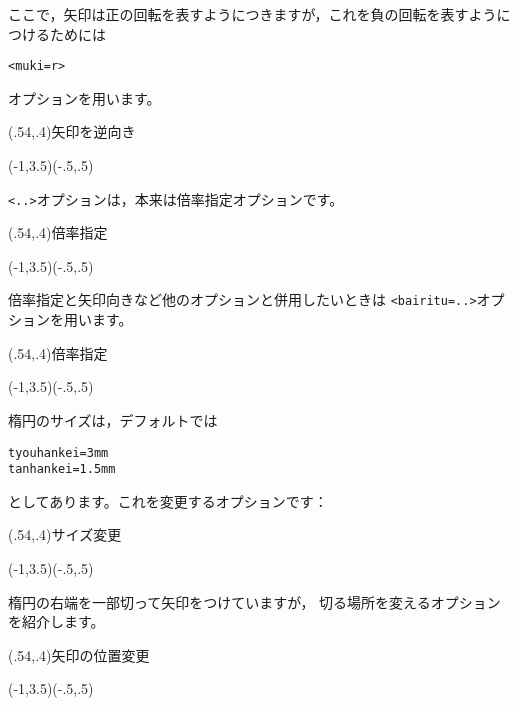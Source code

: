 ここで，矢印は正の回転を表すようにつきますが，これを負の回転を表すように
つけるためには
\begin{jquote}
\begin{verbatim}
<muki=r>
\end{verbatim}
\end{jquote}
オプションを用います。

\begin{showEx}(.54,.4){矢印を逆向き}
\begin{zahyou}[ul=10mm](-1,3.5)(-.5,.5)
\end{zahyou}
\end{showEx}

\verb+<..>+オプションは，本来は倍率指定オプションです。

\begin{showEx}(.54,.4){倍率指定}
\begin{zahyou}[ul=10mm](-1,3.5)(-.5,.5)
\end{zahyou}
\end{showEx}

倍率指定と矢印向きなど他のオプションと併用したいときは
\verb+<bairitu=..>+オプションを用います。

\begin{showEx}(.54,.4){倍率指定}
\begin{zahyou}[ul=10mm](-1,3.5)(-.5,.5)
\end{zahyou}
\end{showEx}

楕円のサイズは，デフォルトでは
\begin{jquote}
\begin{verbatim}
tyouhankei=3mm
tanhankei=1.5mm
\end{verbatim}
\end{jquote}
としてあります。これを変更するオプションです：

\begin{showEx}(.54,.4){サイズ変更}
\begin{zahyou}[ul=10mm](-1,3.5)(-.5,.5)
\end{zahyou}
\end{showEx}

楕円の右端を一部切って矢印をつけていますが，
切る場所を変えるオプションを紹介します。

\begin{showEx}(.54,.4){矢印の位置変更}
\begin{zahyou}[ul=10mm](-1,3.5)(-.5,.5)
\end{zahyou}
\end{showEx}

